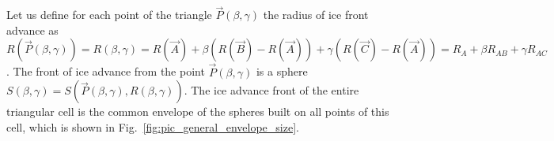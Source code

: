 \documentclass[
11pt,%
tightenlines,%
twoside,%
onecolumn,%
nofloats,%
nobibnotes,%
nofootinbib,%
superscriptaddress,%
noshowpacs,%
centertags]%
{revtex4}
\begin{document}
Let us define for each point of the triangle $\vec{P}(\beta, \gamma)$ the radius of ice front advance as $R(\vec{P}(\beta, \gamma)) = R(\beta, \gamma) = R(\vec{A}) + \beta (R(\vec{B}) - R(\vec{A})) + \gamma (R(\vec{C}) - R(\vec{A} )) = R_A + \beta R_{AB} + \gamma R_{AC}$.
The front of ice advance from the point $\vec{P}(\beta, \gamma)$ is a sphere $S(\beta, \gamma) = S(\vec{P}(\beta, \gamma), R(\beta,\gamma))$.
The ice advance front of the entire triangular cell is the common envelope of the spheres built on all points of this cell, which is shown in Fig.~\ref{fig:pic_general_envelope_size}.
\end{document}
